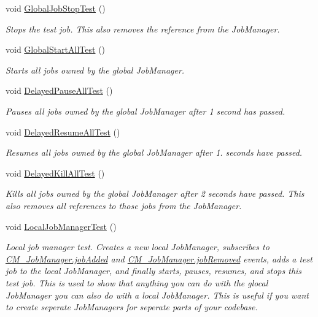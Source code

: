 \begin{DoxyCompactItemize}
void \hyperlink{class_example_job_manager_test_ae9165213486f9d72a0fd0bfc59ab0ab4}{Global\+Job\+Stop\+Test} ()
\begin{DoxyCompactList}\small\item\em Stops the test job. This also removes the reference from the Job\+Manager. \end{DoxyCompactList}\item 
void \hyperlink{class_example_job_manager_test_a031ebb468ce25cdda0d946eda3a8108c}{Global\+Start\+All\+Test} ()
\begin{DoxyCompactList}\small\item\em Starts all jobs owned by the global Job\+Manager. \end{DoxyCompactList}\item 
void \hyperlink{class_example_job_manager_test_a90dd8a5a25c6ad18e507fca1967aca21}{Delayed\+Pause\+All\+Test} ()
\begin{DoxyCompactList}\small\item\em Pauses all jobs owned by the global Job\+Manager after 1 second has passed. \end{DoxyCompactList}\item 
void \hyperlink{class_example_job_manager_test_aa47f66fa961dbf64f689a7e1306ffafc}{Delayed\+Resume\+All\+Test} ()
\begin{DoxyCompactList}\small\item\em Resumes all jobs owned by the global Job\+Manager after 1. seconds have passed. \end{DoxyCompactList}\item 
void \hyperlink{class_example_job_manager_test_a6fb632a5a0a84a997e093b3cd04b1a1b}{Delayed\+Kill\+All\+Test} ()
\begin{DoxyCompactList}\small\item\em Kills all jobs owned by the global Job\+Manager after 2 seconds have passed. This also removes all references to those jobs from the Job\+Manager. \end{DoxyCompactList}\item 
void \hyperlink{class_example_job_manager_test_ae02ae80e68427cd8604e527982ee8b54}{Local\+Job\+Manager\+Test} ()
\begin{DoxyCompactList}\small\item\em Local job manager test. Creates a new local Job\+Manager, subscribes to \hyperlink{class_c_m___job_manager_a0f3c4dff8b782e1b64abcbb7dc19cd8a}{C\+M\+\_\+\+Job\+Manager.\+job\+Added} and \hyperlink{class_c_m___job_manager_a3a24d267ce0e6a09a2cf8f13429f2b73}{C\+M\+\_\+\+Job\+Manager.\+job\+Removed} events, adds a test job to the local Job\+Manager, and finally starts, pauses, resumes, and stops this test job. This is used to show that anything you can do with the glocal Job\+Manager you can also do with a local Job\+Manager. This is useful if you want to create seperate Job\+Managers for seperate parts of your codebase. \end{DoxyCompactList}\end{DoxyCompactItemize}


